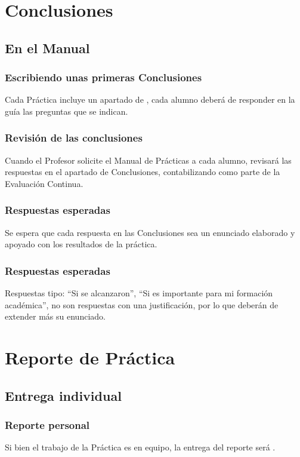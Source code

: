 \documentclass[14pt]{beamer}
\begin{document}
\section{Conclusiones}
\subsection{En el Manual}

\begin{frame}
\frametitle{Escribiendo unas primeras Conclusiones}
Cada Práctica incluye un apartado de , \pause cada alumno deberá de responder en la guía las preguntas que se indican.
\end{frame}
\begin{frame}
\frametitle{Revisión de las conclusiones}
Cuando el Profesor solicite el Manual de Prácticas a cada alumno, revisará las respuestas en el apartado de Conclusiones, contabilizando como parte de la Evaluación Continua.
\end{frame}
\begin{frame}
\frametitle{Respuestas esperadas}
Se espera que cada respuesta en las Conclusiones sea un enunciado elaborado y apoyado con los resultados de la práctica.
\end{frame}
\begin{frame}
\frametitle{Respuestas esperadas}
Respuestas tipo: \pause \enquote{Si se alcanzaron}, \pause \enquote{Si es importante para mi formación académica}, \pause no son respuestas con una justificación, por lo que deberán de extender más su enunciado.
\end{frame}

\section{Reporte de Práctica}
\subsection{Entrega individual}

\begin{frame}
\frametitle{Reporte personal}
Si bien el trabajo de la Práctica es en equipo, \pause la entrega del reporte será .
\end{frame}
\end{document}
